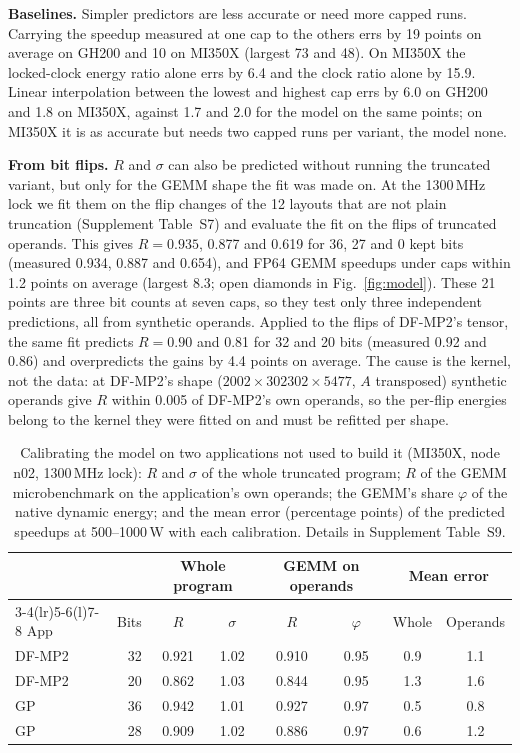 \documentclass[conference]{IEEEtran}
\newcommand{\W}{\,W}
\begin{document}
\textbf{Baselines.} Simpler predictors are less accurate or need more capped runs. Carrying the speedup measured at one
cap to the others errs by 19 points on average on GH200 and 10 on MI350X (largest 73 and 48). On MI350X the locked-clock
energy ratio alone errs by 6.4 and the clock ratio alone by 15.9. Linear interpolation between the lowest and highest cap
errs by 6.0 on GH200 and 1.8 on MI350X, against 1.7 and 2.0 for the model on the same points; on MI350X it is as accurate
but needs two capped runs per variant, the model none.

\textbf{From bit flips.} $R$ and $\sigma$ can also be predicted without running the truncated variant, but only for the
GEMM shape the fit was made on. At the 1300\,MHz lock we fit them on the flip changes of the 12 layouts that are not
plain truncation (Supplement Table~S7) and evaluate the fit on the flips of truncated operands. This gives $R=0.935$,
0.877 and 0.619 for 36, 27 and 0 kept bits (measured 0.934, 0.887 and 0.654), and FP64 GEMM speedups under caps within 1.2
points on average (largest 8.3; open diamonds in Fig.~\ref{fig:model}). These 21 points are three bit counts at seven
caps, so they test only three independent predictions, all from synthetic operands. Applied to the flips of DF-MP2's
tensor, the same fit predicts $R=0.90$ and 0.81 for 32 and 20 bits (measured 0.92 and 0.86) and overpredicts the gains by
4.4 points on average. The cause is the kernel, not the data: at DF-MP2's shape ($2002\times302302\times5477$, $A$
transposed) synthetic operands give $R$ within 0.005 of DF-MP2's own operands, so the per-flip energies belong to the
kernel they were fitted on and must be refitted per shape.

\begin{table}[t]
\caption{Calibrating the model on two applications not used to build it (MI350X, node n02, 1300\,MHz lock): $R$ and
$\sigma$ of the whole truncated program; $R$ of the GEMM microbenchmark on the application's own operands; the GEMM's
share $\varphi$ of the native dynamic energy; and the mean error (percentage points) of the predicted speedups at
500--1000\W{} with each calibration. Details in Supplement Table~S9.}\label{tab:appcal}
\centering\footnotesize\setlength{\tabcolsep}{3pt}
\begin{tabular}{@{}lrcccccc@{}}
\toprule
& & \multicolumn{2}{c}{Whole program} & \multicolumn{2}{c}{GEMM on operands} & \multicolumn{2}{c}{Mean error} \\
\cmidrule(lr){3-4}\cmidrule(lr){5-6}\cmidrule(l){7-8}
App & Bits & $R$ & $\sigma$ & $R$ & $\varphi$ & Whole & Operands \\
\midrule
DF-MP2 & 32 & 0.921 & 1.02 & 0.910 & 0.95 & 0.9 & 1.1 \\
DF-MP2 & 20 & 0.862 & 1.03 & 0.844 & 0.95 & 1.3 & 1.6 \\
GP & 36 & 0.942 & 1.01 & 0.927 & 0.97 & 0.5 & 0.8 \\
GP & 28 & 0.909 & 1.02 & 0.886 & 0.97 & 0.6 & 1.2 \\
\bottomrule
\end{tabular}
\end{table}
\end{document}
